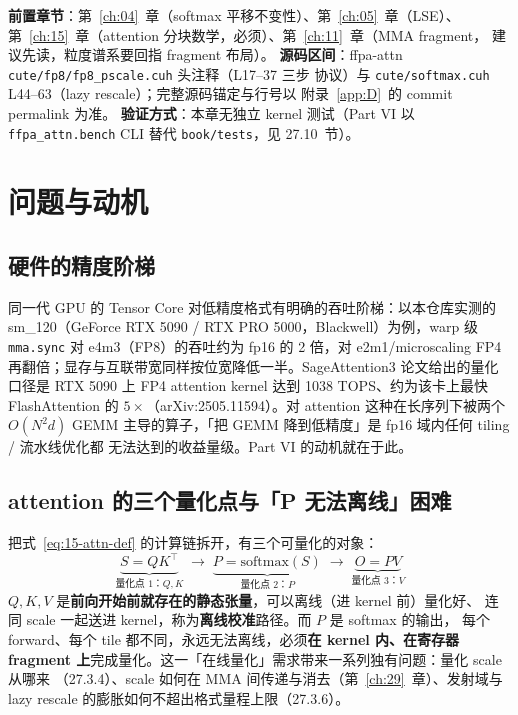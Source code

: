 \textbf{前置章节}：第~\ref{ch:04}~章（softmax 平移不变性）、第~\ref{ch:05}~章（LSE）、
第~\ref{ch:15}~章（attention 分块数学，必须）、第~\ref{ch:11}~章（MMA fragment，
建议先读，粒度谱系要回指 fragment 布局）。
\textbf{源码区间}：ffpa-attn \texttt{cute/fp8/fp8\_pscale.cuh} 头注释（L17--37 三步
协议）与 \texttt{cute/softmax.cuh} L44--63（lazy rescale）；完整源码锚定与行号以
附录~\ref{app:D}~的 commit permalink 为准。
\textbf{验证方式}：本章无独立 kernel 测试（Part VI 以
\texttt{ffpa\_attn.bench} CLI 替代 \texttt{book/tests}，见 27.10~节）。

\section{问题与动机}

\subsection{硬件的精度阶梯}

同一代 GPU 的 Tensor Core 对低精度格式有明确的吞吐阶梯：以本仓库实测的
sm\_120（GeForce RTX 5090 / RTX PRO 5000，Blackwell）为例，warp 级
\texttt{mma.sync} 对 e4m3（FP8）的吞吐约为 fp16 的 2 倍，对 e2m1/microscaling FP4
再翻倍；显存与互联带宽同样按位宽降低一半。SageAttention3 论文给出的量化口径是
RTX 5090 上 FP4 attention kernel 达到 1038 TOPS、约为该卡上最快 FlashAttention
的 $5\times$（arXiv:2505.11594）。对 attention 这种在长序列下被两个 $O(N^2 d)$
GEMM 主导的算子，「把 GEMM 降到低精度」是 fp16 域内任何 tiling / 流水线优化都
无法达到的收益量级。Part VI 的动机就在于此。

\subsection{attention 的三个量化点与「P 无法离线」困难}

把式~\ref{eq:15-attn-def} 的计算链拆开，有三个可量化的对象：
\begin{equation}
  \underbrace{S = QK^{\top}}_{\text{量化点 1：}Q,K}
  \;\longrightarrow\;
  \underbrace{P = \mathrm{softmax}(S)}_{\text{量化点 2：}P}
  \;\longrightarrow\;
  \underbrace{O = PV}_{\text{量化点 3：}V}
\end{equation}
$Q,K,V$ 是\textbf{前向开始前就存在的静态张量}，可以离线（进 kernel 前）量化好、
连同 scale 一起送进 kernel，称为\textbf{离线校准}路径。而 $P$ 是 softmax 的输出，
每个 forward、每个 tile 都不同，永远无法离线，必须\textbf{在 kernel 内、在寄存器
fragment 上}完成量化。这一「在线量化」需求带来一系列独有问题：量化 scale 从哪来
（27.3.4）、scale 如何在 MMA 间传递与消去（第~\ref{ch:29}~章）、发射域与 lazy
rescale 的膨胀如何不超出格式量程上限（27.3.6）。

